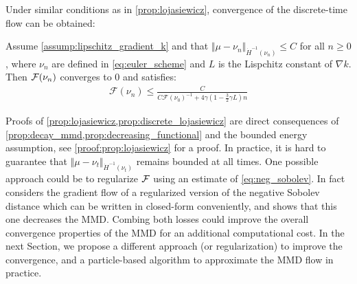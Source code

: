 Under similar conditions as in \cref{prop:lojasiewicz}, convergence of the discrete-time flow can be obtained:
\begin{proposition}\label{prop:discrete_lojasiewicz}
	Assume \cref{assump:lipschitz_gradient_k} and that $\Vert \mu - \nu_n \Vert_{\dot{H}^{-1}(\nu_n)} \leq C$ for all $n\geq 0$, where $\nu_n$ are defined in \cref{eq:euler_scheme} and $L$ is the Lispchitz constant of $\nabla k$. Then ${{\mathcal F}}(\nu_n)$ converges to $0$ and satisfies:
	\begin{align}
	\mathcal{F}(\nu_n)\leq \frac{C}{C\mathcal{F}(\nu_0)^{-1} + 4\gamma(1-\frac{3}{2}\gamma L) n}
	\end{align}
\end{proposition}
Proofs of \cref{prop:lojasiewicz,prop:discrete_lojasiewicz} are direct consequences of \cref{prop:decay_mmd,prop:decreasing_functional} and the bounded energy assumption, see  \cref{proof:prop:lojasiewicz} for a proof.
In practice, it is hard to guarantee that $\Vert \mu - \nu_t \Vert_{\dot{H}^{-1}(\nu_t)} $ remains bounded at all times. One possible approach could be to regularize ${{\mathcal F}}$ using an estimate of \cref{eq:neg_sobolev}. In fact \cite{Mroueh:2019} considers the gradient flow of a regularized version of the negative Sobolev distance which can be written in closed-form conveniently, and shows that this one decreases the MMD. Combing both losses could improve the overall convergence properties of the MMD for an additional computational cost. In the next Section, we propose a different approach (or regularization) to improve the convergence, and a particle-based algorithm to approximate the MMD flow in practice.


 








